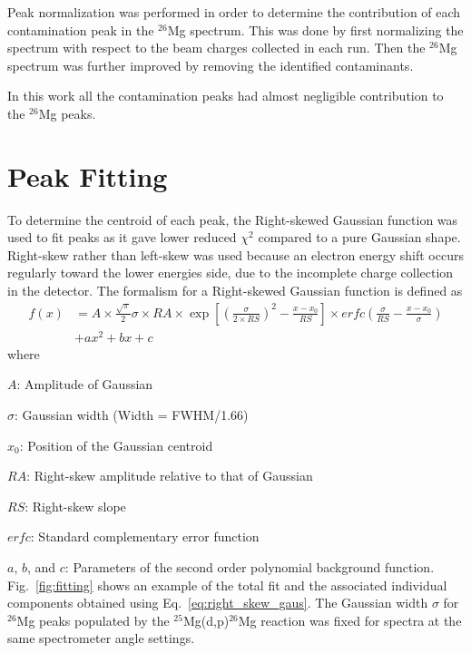 Peak normalization was performed in order to determine the contribution of each contamination peak in the $^{26}$Mg spectrum. This was done by first normalizing the spectrum with respect to the beam charges collected in each run. Then  the $^{26}$Mg spectrum was further improved by removing the identified contaminants. 



In this work all the contamination peaks had almost negligible contribution to the
$^{26}$Mg peaks.

\section{Peak Fitting}
To determine the centroid of each peak, the Right-skewed Gaussian function  was used to fit peaks as it gave lower reduced $\chi^2$ compared to a pure Gaussian shape. Right-skew rather than left-skew  was used because an electron energy shift occurs regularly toward the lower energies side, due to the incomplete charge collection in the detector. The formalism for a Right-skewed Gaussian function is defined as
\begin{equation}
    \label{eq:right_skew_gaus}
    \begin{aligned}
 f(x) & =  A \times \frac{\sqrt{\pi}}{2} \sigma \times RA \times \exp{\left[\left(\frac{\sigma}{2\times RS}\right)^2-\frac{x-x_0}{RS}\right]} \times erfc \left( \frac{\sigma}{RS} - \frac{x-x_0}{\sigma}\right) \\
      & + a x^2 + b x + c
    \end{aligned}
\end{equation}
where

$A$: Amplitude of Gaussian

$\sigma$: Gaussian width (Width = FWHM/1.66)

$x_0$: Position of the Gaussian centroid

$RA$: Right-skew amplitude relative to that of Gaussian

$RS$: Right-skew slope

$erfc$: Standard complementary error function

$a$, $b$, and $c$: Parameters of the second order polynomial background function.
Fig.~\ref{fig:fitting} shows an example of the total fit and the associated individual components obtained using Eq.~\ref{eq:right_skew_gaus}. %
The Gaussian width $\sigma$ for $^{26}$Mg peaks populated by the $^{25}$Mg(d,p)$^{26}$Mg reaction was fixed for spectra at the same spectrometer angle settings.

